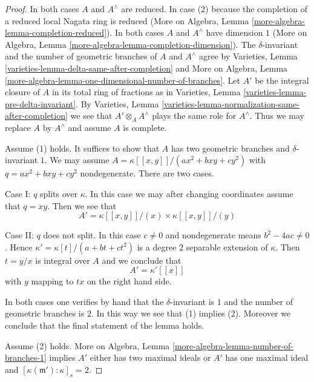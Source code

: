 \begin{proof}
In both cases $A$ and $A^\wedge$ are reduced. In case (2)
because the completion of a reduced local Nagata ring is reduced
(More on Algebra, Lemma \ref{more-algebra-lemma-completion-reduced}).
In both cases $A$ and $A^\wedge$ have dimension $1$
(More on Algebra, Lemma \ref{more-algebra-lemma-completion-dimension}).
The $\delta$-invariant and the number of geometric branches of
$A$ and $A^\wedge$ agree by
Varieties, Lemma \ref{varieties-lemma-delta-same-after-completion}
and
More on Algebra, Lemma
\ref{more-algebra-lemma-one-dimensional-number-of-branches}.
Let $A'$ be the integral closure of $A$ in its total ring of fractions
as in Varieties, Lemma \ref{varieties-lemma-pre-delta-invariant}.
By Varieties, Lemma \ref{varieties-lemma-normalization-same-after-completion}
we see that $A' \otimes_A A^\wedge$ plays the same role for $A^\wedge$.
Thus we may replace $A$ by $A^\wedge$ and assume $A$ is complete.

\medskip\noindent
Assume (1) holds. It suffices to show that $A$ has two
geometric branches and $\delta$-invariant $1$.
We may assume $A = \kappa[[x, y]]/(ax^2 + bxy + cy^2)$ with
$q = ax^2 + bxy + cy^2$ nondegenerate. There are two cases.

\medskip\noindent
Case I: $q$ splits over $\kappa$. In this case we may after
changing coordinates assume that $q = xy$. Then we see that
$$
A' = \kappa[[x, y]]/(x) \times \kappa[[x, y]]/(y)
$$

\medskip\noindent
Case II: $q$ does not split. In this case $c \not = 0$ and
nondegenerate means $b^2 - 4ac \not = 0$. Hence
$\kappa' = \kappa[t]/(a + bt + ct^2)$ is a degree $2$
separable extension of $\kappa$. Then $t = y/x$
is integral over $A$ and we conclude that
$$
A' = \kappa'[[x]]
$$
with $y$ mapping to $tx$ on the right hand side.

\medskip\noindent
In both cases one verifies by hand that the $\delta$-invariant
is $1$ and the number of geometric branches is $2$. In
this way we see that (1) implies (2).
Moreover we conclude that the final statement of the lemma holds.

\medskip\noindent
Assume (2) holds. 
More on Algebra, Lemma \ref{more-algebra-lemma-number-of-branches-1}
implies $A'$ either has two maximal ideals or $A'$ has one maximal ideal
and $[\kappa(\mathfrak m') : \kappa]_s = 2$.


\end{proof}

